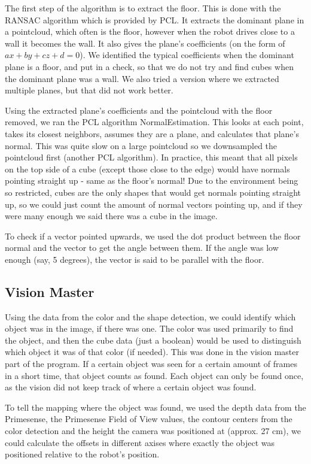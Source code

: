 The first step of the algorithm is to extract the floor. This is done with the
RANSAC algorithm which is provided by PCL. It extracts the dominant plane in a
pointcloud, which often is the floor, however when the robot drives close to a
wall it becomes the wall. It also gives the plane’s coefficients (on the form of
$ax+by+cz+d=0$). We identified the typical coefficients when the dominant plane
is a floor, and put in a check, so that we do not try and find cubes when the
dominant plane was a wall. We also tried a version where we extracted multiple
planes, but that did not work better.

Using the extracted plane’s coefficients and the pointcloud with the floor
removed, we ran the PCL algorithm NormalEstimation. This looks at each point,
takes its closest neighbors, assumes they are a plane, and calculates that
plane’s normal. This was quite slow on a large pointcloud so we downsampled the
pointcloud first (another PCL algorithm). In practice, this meant that all
pixels on the top side of a cube (except those close to the edge) would have
normals pointing straight up - same as the floor’s normal! Due to the
environment being so restricted, cubes are the only shapes that would get
normals pointing straight up, so we could just count the amount of normal
vectors pointing up, and if they were many enough we said there was a cube in
the image.

To check if a vector pointed upwards, we used the dot product between the floor
normal and the vector to get the angle between them. If the angle was low enough
(say, 5 degrees), the vector is said to be parallel with the floor.
\subsection{Vision Master}
Using the data from the color and the shape detection, we could identify which
object was in the image, if there was one. The color was used primarily to find
the object, and then the cube data (just a boolean) would be used to distinguish
which object it was of that color (if needed). This was done in the vision
master part of the program. If a certain object was seen for a certain amount of
frames in a short time, that object counts as found. Each object can only be
found once, as the vision did not keep track of where a certain object was
found.

To tell the mapping where the object was found, we used the depth data from the
Primesense, the Primesense Field of View values, the contour centers from the
color detection and the height the camera was positioned at (approx. 27 cm), we
could calculate the offsets in different axises where exactly the object was
positioned relative to the robot’s position.

